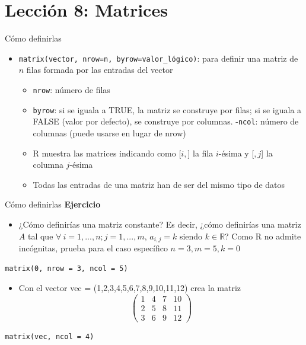 \documentclass[
  ignorenonframetext,
  aspectratio=169]{beamer}
\providecommand{\tightlist}{%
  \setlength{\itemsep}{0pt}\setlength{\parskip}{0pt}}
\begin{document}
\section{Lección 8: Matrices}\label{lecciuxf3n-8-matrices}

\begin{frame}[fragile]{Cómo definirlas}
\label{cuxf3mo-definirlas}
\begin{itemize}
\tightlist
\item
  \texttt{matrix(vector,\ nrow=n,\ byrow=valor\_lógico)}: para definir
  una matriz de \(n\) filas formada por las entradas del vector

  \begin{itemize}
  \tightlist
  \item
    \texttt{nrow}: número de filas
  \item
    \texttt{byrow}: si se iguala a TRUE, la matriz se construye por
    filas; si se iguala a FALSE (valor por defecto), se construye por
    columnas. -\texttt{ncol}: número de columnas (puede usarse en lugar
    de nrow)
  \item
    R muestra las matrices indicando como {[}\(i,\){]} la fila
    \(i\)-ésima y {[}\(,j\){]} la columna \(j\)-ésima
  \item
    Todas las entradas de una matriz han de ser del mismo tipo de datos
  \end{itemize}
\end{itemize}
\end{frame}

\begin{frame}[fragile]{Cómo definirlas}
\label{cuxf3mo-definirlas-1}
\textbf{Ejercicio}

\begin{itemize}
\tightlist
\item
  ¿Cómo definirías una matriz constante? Es decir, ¿cómo definirías una
  matriz \(A\) tal que \(\forall\  i=1,...,n; j = 1,...,m\),
  \(a_{i,j}=k\) siendo \(k\in\mathbb{R}\)? Como R no admite incógnitas,
  prueba para el caso específico \(n = 3, m = 5, k = 0\)
\end{itemize}

\begin{verbatim}
matrix(0, nrow = 3, ncol = 5)
\end{verbatim}

\begin{itemize}
\tightlist
\item
  Con el vector vec = (1,2,3,4,5,6,7,8,9,10,11,12) crea la matriz
  \[\begin{pmatrix}
  1 & 4 & 7 & 10\\
  2 & 5 & 8 & 11\\
  3 & 6 & 9 & 12
  \end{pmatrix}\]
\end{itemize}

\begin{verbatim}
matrix(vec, ncol = 4)
\end{verbatim}
\end{frame}
\end{document}
